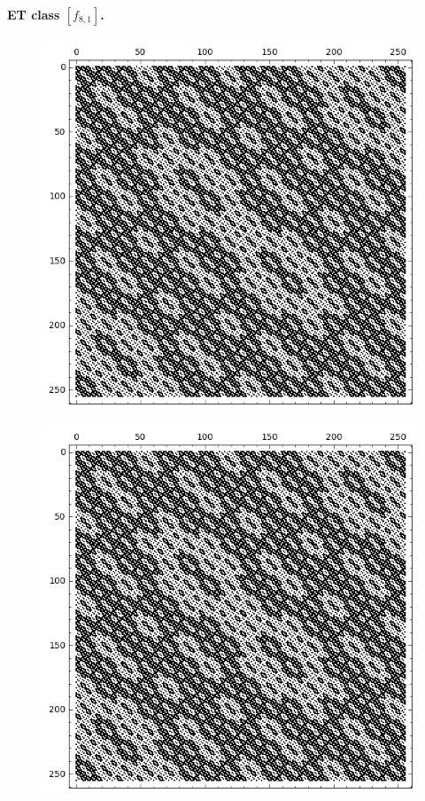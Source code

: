 \documentclass[12pt,a4paper]{article}
\begin{document}
\paragraph*{ET class $[f_{8,1}]$.}
\begin{figure}[!hb]
\centering
\begin{minipage}{.48\textwidth}
  \centering
  \includegraphics[width=.9\linewidth]{../matrix_plot/re8_1_weight_class_matrix.png}
  \label{fig:8_1_weight_class_matrix}
\end{minipage}%
\begin{minipage}{.48\textwidth}
  \centering
  \includegraphics[width=.9\linewidth]{../matrix_plot/re8_1_bent_cayley_graph_index_matrix.png}
  \label{fig:8_1_bent_cayley_graph_index_matrix}
\end{minipage}
\end{figure}
~
\end{document}
